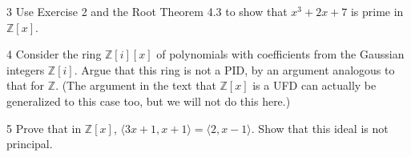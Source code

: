 \begin{problem}{3}
    Use Exercise 2 and the Root Theorem 4.3 to show that $x^3 + 2x + 7$ is prime in
    $\mathbb{Z}[x]$.
\end{problem}
\unsolved

\begin{problem}{4}
    Consider the ring $\mathbb{Z}[i][x]$ of polynomials with coefficients from the
    Gaussian integers $\mathbb{Z}[i]$. Argue that this ring is not a PID, by an argument
    analogous to that for $\mathbb{Z}$. (The argument in the text that $\mathbb{Z}[x]$ is
    a UFD can actually be generalized to this case too, but we will not do this here.)
\end{problem}
\unsolved

\begin{problem}{5}
    Prove that in $\mathbb{Z}[x]$, $\langle 3x + 1, x + 1 \rangle = \langle 2, x - 1 \rangle$.
    Show that this ideal is not principal.
\end{problem}
\unsolved
